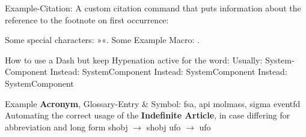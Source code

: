 %


\label{chap:chapter1}


Example-Citation:
\cite{DenKr_denkrement1_indeco}
\nl%
A custom citation command that puts information about the reference to the footnote on first occurrence:
%

\npi%
Some special characters:
»«.
\nl%
Some Example Macro:
.

\npi
How to use a Dash but keep Hypenation active for the word:\nl
\noindent Usually:\hspace{0.89\linewidth} System-Component\nl
\noindent Instead:\hspace{0.885\linewidth} System\hyphdash{}Component\nl
\noindent Instead:\hspace{0.855\linewidth} System\hyphdash{}Component\nl
\noindent Instead:\hspace{0.805\linewidth} System\hyphdash{}Component

\npi%
Example \textbf{Acronym}, Glossary-Entry \& Symbol:\nl
\gls{fsa}, \gls{api}\nl
\gls{molmass}, \gls{sigma}\nl
\gls{eventfd}\nl
Automating the correct usage of the \textbf{Indefinite Article}, in case differing for abbreviation and long form\nl
{} \gls{shobj} $\rightarrow$  \gls{shobj}\nl
{} \gls{ufo} $\rightarrow$  \gls{ufo}

